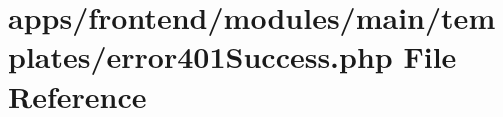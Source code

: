 \hypertarget{frontend_2modules_2main_2templates_2error401_success_8php}{\section{apps/frontend/modules/main/templates/error401\-Success.php File Reference}
\label{frontend_2modules_2main_2templates_2error401_success_8php}
}
